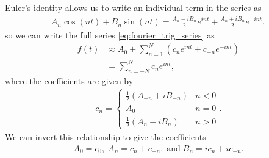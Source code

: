 \documentclass[10pt]{article}
\begin{document}
Euler's identity allows us to write an individual term in the series as \begin{align*}
    A_n \cos(nt) + B_n \sin(nt) = \frac{A_n - iB_n}{2}e^{int} + \frac{A_n+iB_n}{2}e^{-int},
\end{align*} so we can write the full series \eqref{eq:fourier_trig_series} as \begin{align}
    f(t) &\approx A_0 + \sum_{n=1}^{N} \left(c_ne^{int} + c_{-n}e^{-int}\right) \nonumber \\
         &= \sum_{n=-N}^{N} c_ne^{int}, \label{eq:fourier_exp_series}
\end{align} where the coefficients are given by \begin{align*}
    c_n = \begin{cases}
        \frac{1}{2}\left(A_{-n} + iB_{-n}\right) & n < 0 \\
        A_0 & n = 0 \\
        \frac{1}{2}\left(A_{n} - iB_{n}\right) & n > 0
    \end{cases}.
\end{align*} We can invert this relationship to give the coefficients \begin{align}\label{eq:fourier_exp_coeffs}
    A_0 = c_0,\;A_n = c_n + c_{-n},\;\mathrm{and}\;B_n = ic_n + ic_{-n}.
\end{align}
\end{document}
